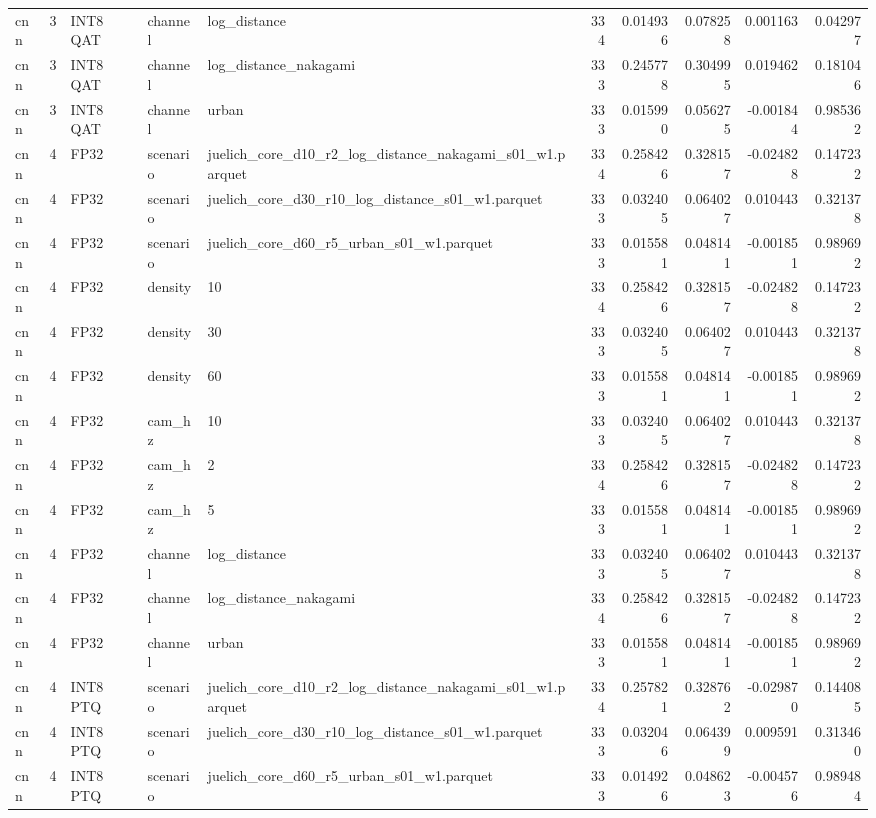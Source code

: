 \begin{tabular}{lrlllrrrrr}
cnn & 3 & INT8 QAT & channel & log\_distance & 334 & 0.014936 & 0.078258 & 0.001163 & 0.042977 \\
cnn & 3 & INT8 QAT & channel & log\_distance\_nakagami & 333 & 0.245778 & 0.304995 & 0.019462 & 0.181046 \\
cnn & 3 & INT8 QAT & channel & urban & 333 & 0.015990 & 0.056275 & -0.001844 & 0.985362 \\
cnn & 4 & FP32 & scenario & juelich\_core\_d10\_r2\_log\_distance\_nakagami\_s01\_w1.parquet & 334 & 0.258426 & 0.328157 & -0.024828 & 0.147232 \\
cnn & 4 & FP32 & scenario & juelich\_core\_d30\_r10\_log\_distance\_s01\_w1.parquet & 333 & 0.032405 & 0.064027 & 0.010443 & 0.321378 \\
cnn & 4 & FP32 & scenario & juelich\_core\_d60\_r5\_urban\_s01\_w1.parquet & 333 & 0.015581 & 0.048141 & -0.001851 & 0.989692 \\
cnn & 4 & FP32 & density & 10 & 334 & 0.258426 & 0.328157 & -0.024828 & 0.147232 \\
cnn & 4 & FP32 & density & 30 & 333 & 0.032405 & 0.064027 & 0.010443 & 0.321378 \\
cnn & 4 & FP32 & density & 60 & 333 & 0.015581 & 0.048141 & -0.001851 & 0.989692 \\
cnn & 4 & FP32 & cam\_hz & 10 & 333 & 0.032405 & 0.064027 & 0.010443 & 0.321378 \\
cnn & 4 & FP32 & cam\_hz & 2 & 334 & 0.258426 & 0.328157 & -0.024828 & 0.147232 \\
cnn & 4 & FP32 & cam\_hz & 5 & 333 & 0.015581 & 0.048141 & -0.001851 & 0.989692 \\
cnn & 4 & FP32 & channel & log\_distance & 333 & 0.032405 & 0.064027 & 0.010443 & 0.321378 \\
cnn & 4 & FP32 & channel & log\_distance\_nakagami & 334 & 0.258426 & 0.328157 & -0.024828 & 0.147232 \\
cnn & 4 & FP32 & channel & urban & 333 & 0.015581 & 0.048141 & -0.001851 & 0.989692 \\
cnn & 4 & INT8 PTQ & scenario & juelich\_core\_d10\_r2\_log\_distance\_nakagami\_s01\_w1.parquet & 334 & 0.257821 & 0.328762 & -0.029870 & 0.144085 \\
cnn & 4 & INT8 PTQ & scenario & juelich\_core\_d30\_r10\_log\_distance\_s01\_w1.parquet & 333 & 0.032046 & 0.064399 & 0.009591 & 0.313460 \\
cnn & 4 & INT8 PTQ & scenario & juelich\_core\_d60\_r5\_urban\_s01\_w1.parquet & 333 & 0.014926 & 0.048623 & -0.004576 & 0.989484 \\

\end{tabular}
